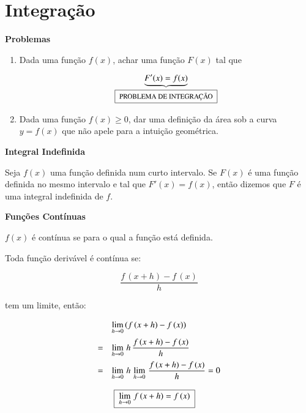 \section{Integração}

\textbf{Problemas}

\begin{enumerate}
 \item Dada uma função $f(x)$, achar uma função $F(x)$ tal que

\[
 \underbrace{F'(x) = f(x)}_{\footnotesize{\quadricular{\mbox{PROBLEMA DE INTEGRAÇÃO}}}}
\]

\begin{center}
 \small 
\end{center}

\item Dada uma função $f(x) \geq 0$, dar uma definição da área sob a curva $y = f(x)$ que não apele para a intuição geométrica.

\end{enumerate}

\begin{enumerar}  

\item \textbf{Integral Indefinida}

Seja $f(x)$ uma função definida num curto intervalo. Se $F(x)$ é uma função definida no mesmo intervalo e tal que $F'(x) = f(x)$, então dizemos que $F$ é uma integral indefinida de $f$.

\item \textbf{Funções Contínuas}

$f(x)$ é contínua se  para o qual a função está definida.

Toda função derivável é contínua se:

\[
 \frac{f\,(x+h) - f\,(x)}{h}
\]

tem um limite, então:

\[
\begin{array}{ll}
   & \displaystyle \lim_{h \to 0} \, (f\,(x+h) - f\,(x)) \vspace*{0.2cm} \\
 = & \displaystyle \lim_{h \to 0} \, h \, \frac{f\,(x+h) - f\,(x)}{h} \vspace*{0.2cm} \\
 = & \displaystyle \lim_{h \to 0} \, h \, \lim_{h \to 0} \, \frac{f\,(x+h) - f\,(x)}{h} = 0 \\ \\
   & \quadricular{\displaystyle \lim_{h \to 0} \, f\,(x+h) = f\,(x)}
\end{array}
\]

\end{enumerar}

